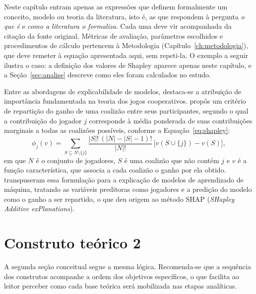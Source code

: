 \begin{orientacao}
  Neste capítulo entram apenas as expressões que definem formalmente um conceito, modelo ou teoria da literatura, isto é, as que respondem à pergunta \emph{o que é} e \emph{como a literatura o formaliza}. Cada uma deve vir acompanhada da citação da fonte original. Métricas de avaliação, parâmetros escolhidos e procedimentos de cálculo pertencem à Metodologia (Capítulo~\ref{ch:metodologia}), que deve remeter à equação apresentada aqui, sem repeti-la. O exemplo a seguir ilustra o caso: a definição dos valores de Shapley aparece apenas neste capítulo, e a Seção~\ref{sec:analise} descreve como eles foram calculados no estudo.
\end{orientacao}

Entre as abordagens de explicabilidade de modelos, destaca-se a atribuição de importância fundamentada na teoria dos jogos cooperativos.  propôs um critério de repartição do ganho de uma coalizão entre seus participantes, segundo o qual a contribuição do jogador $j$ corresponde à média ponderada de suas contribuições marginais a todas as coalizões possíveis, conforme a Equação~\eqref{eq:shapley}:
\begin{equation}
  \phi_j(v) = \sum_{S \subseteq N \setminus \{j\}} \frac{|S|!\,\left(|N| - |S| - 1\right)!}{|N|!}\,\Big[ v\left(S \cup \{j\}\right) - v(S) \Big],
  \label{eq:shapley}
\end{equation}
em que $N$ é o conjunto de jogadores, $S$ é uma coalizão que não contém $j$ e $v$ é a função característica, que associa a cada coalizão o ganho por ela obtido.  transpuseram essa formulação para a explicação de modelos de aprendizado de máquina, tratando as variáveis preditoras como jogadores e a predição do modelo como o ganho a ser repartido, o que deu origem ao método SHAP (\textit{SHapley Additive exPlanations}).

\section{Construto teórico 2}
\label{sec:construto_2}
A segunda seção conceitual segue a mesma lógica. Recomenda-se que a sequência dos construtos acompanhe a ordem dos objetivos específicos, o que facilita ao leitor perceber como cada base teórica será mobilizada nas etapas analíticas.

